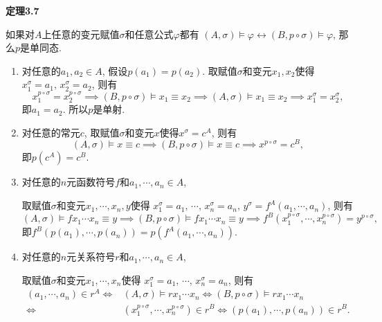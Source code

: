 \documentclass[UTF8]{ctexart}
\begin{document}
\vspace{10pt}

\hypertarget{sec:定理3.7}{}
\noindent\textbf{定理3.7}

如果对$A$上任意的变元赋值$\sigma$和任意公式$\varphi$都有
$(A,\sigma)\models\varphi\leftrightarrow(B,p\circ\sigma)\models\varphi$,
那么$p$是单同态.


\begin{enumerate}
    \item 对任意的$a_1,a_2\in A$, 假设$p(a_1)=p(a_2)$.
    取赋值$\sigma$和变元$x_1,x_2$使得$x_1^\sigma=a_1,\,x_2^\sigma=a_2$, 则有
    \[
        x_1^{p\circ\sigma}=x_2^{p\circ\sigma}\implies
        (B,p\circ\sigma)\models x_1\equiv x_2\implies
        (A,\sigma)\models x_1\equiv x_2\implies x_1^\sigma=x_2^\sigma,
    \]
    即$a_1=a_2$. 所以$p$是单射.

    \item 对任意的常元$c$, 取赋值$\sigma$和变元$x$使得$x^\sigma=c^A$, 则有
    \[
        (A,\sigma)\models x\equiv c\implies
        (B,p\circ\sigma)\models x\equiv c\implies
        x^{p\circ\sigma}=c^B,
    \]
    即$p(c^A)=c^B$.

    \item 对任意的$n$元函数符号$f$和$a_1,\cdots,a_n\in A$,
    
    \hspace{2.17em}
    取赋值$\sigma$和变元$x_1,\cdots,x_n,y$使得
    $x_1^\sigma=a_1,\,\cdots,\,x_n^\sigma=a_n,\,y^\sigma=f^A(a_1,\cdots,a_n)$, 则有
    \[
        (A,\sigma)\models fx_1\cdots x_n\equiv y\implies
        (B,p\circ\sigma)\models fx_1\cdots x_n\equiv y\implies
        f^B(x_1^{p\circ\sigma},\cdots,x_n^{p\circ\sigma})=y^{p\circ\sigma},
    \]
    即$f^B(p(a_1),\cdots,p(a_n))=p(f^A(a_1,\cdots,a_n))$.
    \item 对任意的$n$元关系符号$r$和$a_1,\cdots,a_n\in A$,
    
    \hspace{2.17em}
    取赋值$\sigma$和变元$x_1,\cdots,x_n$使得
    $x_1^\sigma=a_1,\,\cdots,\,x_n^\sigma=a_n$, 则有
    \begin{equation*}\begin{aligned}
        (a_1,\cdots,a_n)\in r^A\iff&(A,\sigma)\models rx_1\cdots x_n\iff
        (B,p\circ\sigma)\models rx_1\cdots x_n\\[-3pt]
        \iff&(x_1^{p\circ\sigma},\cdots,x_n^{p\circ\sigma})\in r^B\iff
        (p(a_1),\cdots,p(a_n))\in r^B.
    \end{aligned}\tag*{\qedsymbol}\end{equation*}
\end{enumerate}
\end{document}
